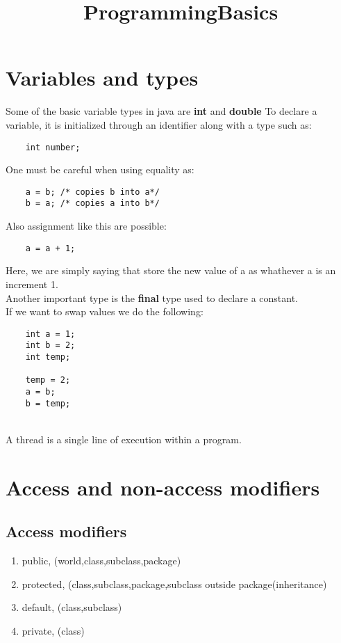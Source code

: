 \documentclass{article}
\date{\vspace{-5ex}}
\title{ProgrammingBasics}
\begin{document}
\maketitle

\section{Variables and types}
Some of the basic variable types in java are \textbf{int} and \textbf{double}
To declare a variable, it is initialized through an identifier along with a type such as:

\begin{verbatim}
    int number; 
\end{verbatim}

One must be careful when using equality as:
\begin{verbatim}
    a = b; /* copies b into a*/
    b = a; /* copies a into b*/
\end{verbatim}

Also assignment like this are possible:

\begin{verbatim}
    a = a + 1;
\end{verbatim}

Here, we are simply saying that store the new value of a as whathever a is an increment 1. 
\\
Another important type is the \textbf{final} type used to declare a constant. 
\\
If we want to swap values we do the following:
\begin{verbatim}
    int a = 1;
    int b = 2;
    int temp;
    
    temp = 2;
    a = b;
    b = temp;
\end{verbatim}
\\
A thread is a single line of execution within a program. 

\section{Access and non-access modifiers}

\subsection{Access modifiers}

\begin{enumerate}
    \item public, (world,class,subclass,package)
    \item protected, (class,subclass,package,subclass outside package(inheritance)
    \item default, (class,subclass)
    \item private, (class)
\end{enumerate}
\end{document}
